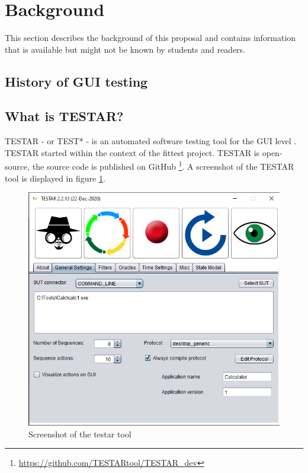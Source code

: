 \section{Background} \label{background}
    This section describes the background of this proposal and contains information that is available but might not be known by students and readers. 
    

\subsection{History of GUI testing}






\subsection{What is TESTAR?}
    TESTAR - or TEST* - is an automated software testing tool for the GUI level \cite{testar-about}. TESTAR started within the context of the \acrfull{fittest} project. TESTAR is open-source, the source code is published on GitHub \footnote{ \url{https://github.com/TESTARtool/TESTAR\_dev}}. A screenshot of the TESTAR tool is displayed in figure \ref{fig:testar}.
    
    \begin{figure}[h]
        \includegraphics[scale=0.5]{pics/testar.png}
        \caption{Screenshot of the testar tool}
        \label{fig:testar}
    \end{figure}
    
